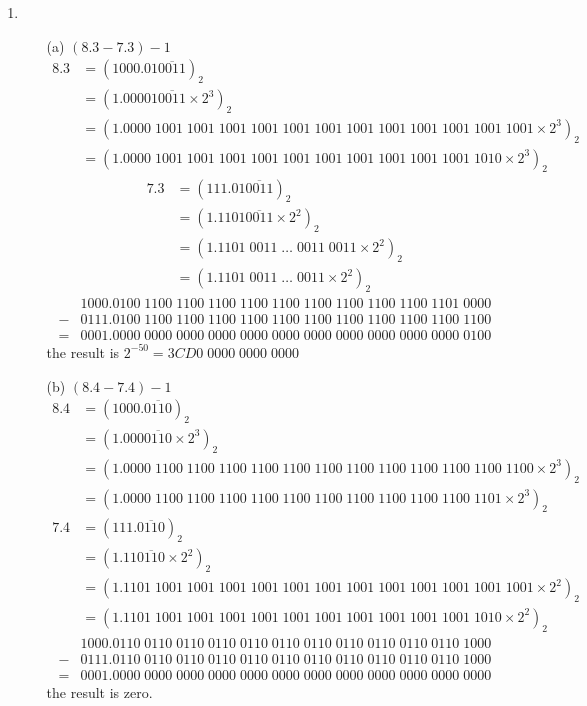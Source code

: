 \documentclass[UTF8]{ctexart}
\begin{document}
\begin{enumerate}
\item \begin{itemize}
\item[(a)] $(8.3 - 7.3) - 1$
\begin{align*}
8.3 &= (1000.01\overline{0011})_2 \\
&= (1.00001\overline{0011} \times 2^3)_2 \\
&= (1.0000\;1001\;1001\;1001\;1001\;1001\;1001\;1001\;1001\;1001\;1001\;1001\;1001 \times 2^3)_2 \\
&= (1.0000\;1001\;1001\;1001\;1001\;1001\;1001\;1001\;1001\;1001\;1001\;1010 \times 2^3)_2
\end{align*}
\begin{align*}
7.3 &= (111.01\overline{0011})_2 \\
&= (1.1101\overline{0011} \times 2^2)_2 \\
&= (1.1101\;0011\;\dots\;0011\;0011 \times 2^2)_2 \\
&= (1.1101\;0011\;\dots\;0011 \times 2^2)_2
\end{align*}
\begin{align*}
 &1000.0100\;1100\;1100\;1100\;1100\;1100\;1100\;1100\;1100\;1100\;1101\;0000 \\
-&0111.0100\;1100\;1100\;1100\;1100\;1100\;1100\;1100\;1100\;1100\;1100\;1100 \\
\hline
=&0001.0000\;0000\;0000\;0000\;0000\;0000\;0000\;0000\;0000\;0000\;0000\;0100
\end{align*}
the result is $2^{-50} = 3CD0\;0000\;0000\;0000$

\item[(b)] $(8.4 - 7.4) - 1$
\begin{align*}
8.4 &= (1000.\overline{0110})_2 \\
&= (1.000\overline{0110} \times 2^3)_2 \\
&= (1.0000\;1100\;1100\;1100\;1100\;1100\;1100\;1100\;1100\;1100\;1100\;1100\;1100 \times 2^3)_2 \\
&= (1.0000\;1100\;1100\;1100\;1100\;1100\;1100\;1100\;1100\;1100\;1100\;1101 \times 2^3)_2
\end{align*}
\begin{align*}
7.4 &= (111.\overline{0110})_2 \\
&= (1.11\overline{0110} \times 2^2)_2 \\
&= (1.1101\;1001\;1001\;1001\;1001\;1001\;1001\;1001\;1001\;1001\;1001\;1001\;1001 \times 2^2)_2 \\
&= (1.1101\;1001\;1001\;1001\;1001\;1001\;1001\;1001\;1001\;1001\;1001\;1010 \times 2^2)_2
\end{align*}
\begin{align*}
 &1000.0110\;0110\;0110\;0110\;0110\;0110\;0110\;0110\;0110\;0110\;0110\;1000 \\
-&0111.0110\;0110\;0110\;0110\;0110\;0110\;0110\;0110\;0110\;0110\;0110\;1000 \\
\hline
=&0001.0000\;0000\;0000\;0000\;0000\;0000\;0000\;0000\;0000\;0000\;0000\;0000
\end{align*}
the result is zero.


\end{itemize}
\end{enumerate}
\end{document}
